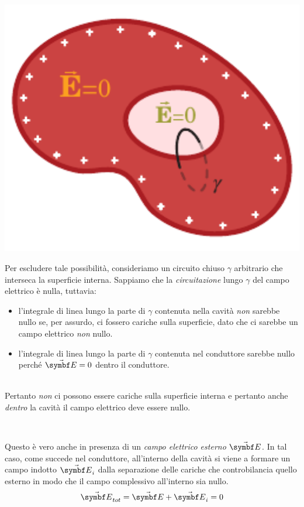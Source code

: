 \begin{demonstration}
\begin{minipage}{0.35\textwidth}
	\begin{center}
		\includegraphics[width=1\textwidth]{images/chp4/chp4condcavodim2.pdf}
	\end{center}
\end{minipage}\hspace{5pt}
\begin{minipage}{0.64\textwidth}
	Per escludere tale possibilità, consideriamo un circuito chiuso $\gamma$ arbitrario che interseca la superficie interna.
	Sappiamo che la \textit{circuitazione} lungo $\gamma$ del campo elettrico è nulla, tuttavia:
	\begin{itemize}
		\item l'integrale di linea lungo la parte di $\gamma$ contenuta nella cavità \textit{non} sarebbe nullo se, per assurdo, ci fossero cariche sulla superficie, dato che ci sarebbe un campo elettrico \textit{non} nullo.
		\item l'integrale di linea lungo la parte di $\gamma$ contenuta nel conduttore sarebbe nullo perché $\vba{E}=0$ dentro il conduttore.
	\end{itemize}
\end{minipage}\\
Pertanto \textit{non} ci possono essere cariche sulla superficie interna e pertanto anche \textit{dentro} la cavità il campo elettrico deve essere nullo.
\end{demonstration}~\\
\begin{minipage}{0.56\textwidth}
Questo è vero anche in presenza di un \textit{campo elettrico esterno} $\vba{E}$. In tal caso, come succede nel conduttore, all'interno della cavità si viene a formare un campo indotto $\vba{E}_i$ dalla separazione delle cariche  che controbilancia quello esterno in modo che il campo complessivo all'interno sia nullo.
\begin{equation*}
	\vba{E}_{tot}=\vba{E}+\vba{E}_i=0
\end{equation*}
\end{minipage}
